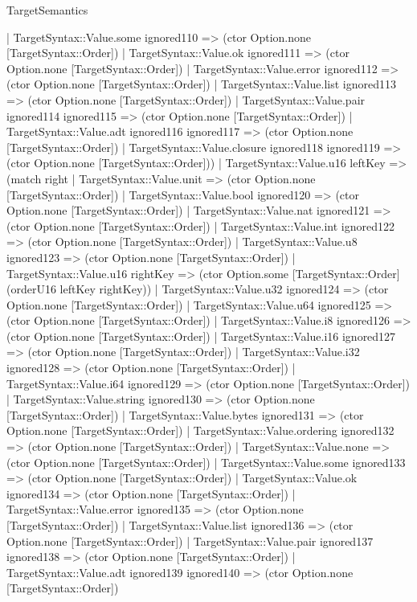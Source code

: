 \begin{lexlean}{TargetSemantics}
\begin{semanticmodule}
{      | TargetSyntax::Value.some ignored110 => (ctor Option.none [TargetSyntax::Order])
      | TargetSyntax::Value.ok ignored111 => (ctor Option.none [TargetSyntax::Order])
      | TargetSyntax::Value.error ignored112 => (ctor Option.none [TargetSyntax::Order])
      | TargetSyntax::Value.list ignored113 => (ctor Option.none [TargetSyntax::Order])
      | TargetSyntax::Value.pair ignored114 ignored115 => (ctor Option.none [TargetSyntax::Order])
      | TargetSyntax::Value.adt ignored116 ignored117 => (ctor Option.none [TargetSyntax::Order])
      | TargetSyntax::Value.closure ignored118 ignored119 => (ctor Option.none [TargetSyntax::Order]))
    | TargetSyntax::Value.u16 leftKey => (match right
      | TargetSyntax::Value.unit => (ctor Option.none [TargetSyntax::Order])
      | TargetSyntax::Value.bool ignored120 => (ctor Option.none [TargetSyntax::Order])
      | TargetSyntax::Value.nat ignored121 => (ctor Option.none [TargetSyntax::Order])
      | TargetSyntax::Value.int ignored122 => (ctor Option.none [TargetSyntax::Order])
      | TargetSyntax::Value.u8 ignored123 => (ctor Option.none [TargetSyntax::Order])
      | TargetSyntax::Value.u16 rightKey => (ctor Option.some [TargetSyntax::Order] (orderU16 leftKey rightKey))
      | TargetSyntax::Value.u32 ignored124 => (ctor Option.none [TargetSyntax::Order])
      | TargetSyntax::Value.u64 ignored125 => (ctor Option.none [TargetSyntax::Order])
      | TargetSyntax::Value.i8 ignored126 => (ctor Option.none [TargetSyntax::Order])
      | TargetSyntax::Value.i16 ignored127 => (ctor Option.none [TargetSyntax::Order])
      | TargetSyntax::Value.i32 ignored128 => (ctor Option.none [TargetSyntax::Order])
      | TargetSyntax::Value.i64 ignored129 => (ctor Option.none [TargetSyntax::Order])
      | TargetSyntax::Value.string ignored130 => (ctor Option.none [TargetSyntax::Order])
      | TargetSyntax::Value.bytes ignored131 => (ctor Option.none [TargetSyntax::Order])
      | TargetSyntax::Value.ordering ignored132 => (ctor Option.none [TargetSyntax::Order])
      | TargetSyntax::Value.none => (ctor Option.none [TargetSyntax::Order])
      | TargetSyntax::Value.some ignored133 => (ctor Option.none [TargetSyntax::Order])
      | TargetSyntax::Value.ok ignored134 => (ctor Option.none [TargetSyntax::Order])
      | TargetSyntax::Value.error ignored135 => (ctor Option.none [TargetSyntax::Order])
      | TargetSyntax::Value.list ignored136 => (ctor Option.none [TargetSyntax::Order])
      | TargetSyntax::Value.pair ignored137 ignored138 => (ctor Option.none [TargetSyntax::Order])
      | TargetSyntax::Value.adt ignored139 ignored140 => (ctor Option.none [TargetSyntax::Order])
}
\end{semanticmodule}
\end{lexlean}

